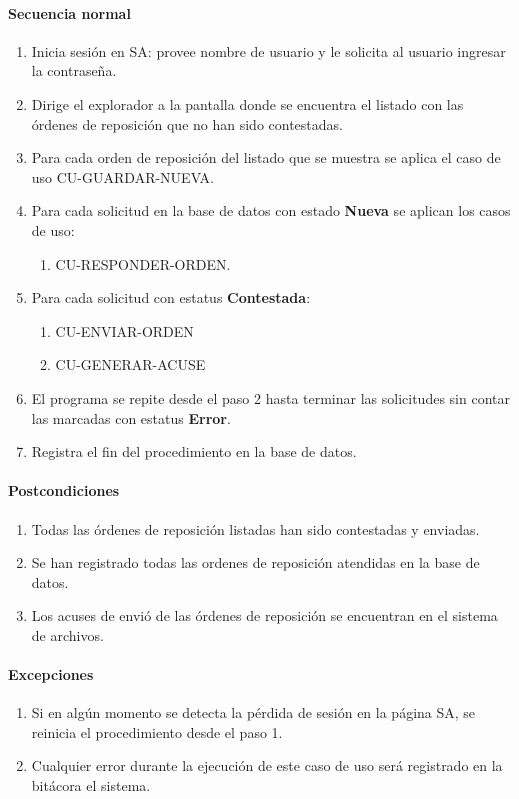 \paragraph{Secuencia normal}
\begin{enumerate}
  \item Inicia sesión en SA: provee nombre de usuario y le solicita al usuario ingresar la contraseña.
  \item Dirige el explorador a la pantalla donde se encuentra el listado con las órdenes de reposición que no han sido contestadas.
  \item Para cada orden de reposición del listado que se muestra se aplica el caso de uso CU-GUARDAR-NUEVA.
  \item Para cada solicitud en la base de datos con estado \textbf{Nueva} se aplican los casos de uso:
  \begin{enumerate}
    \item CU-RESPONDER-ORDEN.
  \end{enumerate}
  \item Para cada solicitud con estatus \textbf{Contestada}:
  \begin{enumerate}
    \item CU-ENVIAR-ORDEN
    \item CU-GENERAR-ACUSE
  \end{enumerate}
  \item El programa se repite desde el paso 2 hasta terminar las solicitudes sin contar las marcadas con estatus \textbf{Error}.
  \item Registra el fin del procedimiento en la base de datos.
\end{enumerate}
\paragraph{Postcondiciones}
\begin{enumerate}
  \item Todas las órdenes de reposición listadas han sido contestadas y enviadas.
  \item Se han registrado todas las ordenes de reposición atendidas en la base de datos.
  \item Los acuses de envió de las órdenes de reposición se encuentran en el sistema de archivos.
\end{enumerate}
\paragraph{Excepciones}
\begin{enumerate}
  \item Si en algún momento se detecta la pérdida de sesión en la página SA, se reinicia el procedimiento desde el paso 1.
  \item Cualquier error durante la ejecución de este caso de uso será registrado en la bitácora el sistema.
\end{enumerate}


